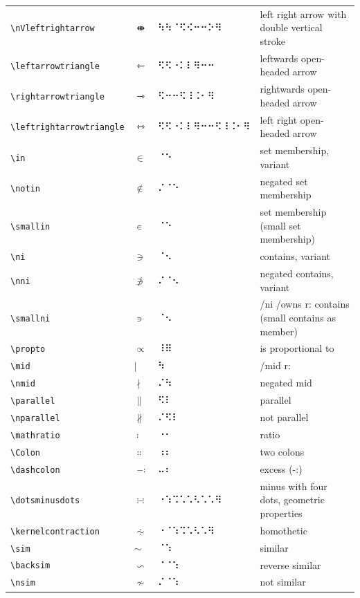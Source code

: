 \documentclass[oneside]{article}
\begin{document}
\begin{longtable}{llll}
\verb|\nVleftrightarrow| & $\nVleftrightarrow$ &   ⠳⠳⠈⠫⠪⠒⠒⠕⠻   & {left right arrow with double vertical stroke} \\[2ex]
\verb|\leftarrowtriangle| & $\leftarrowtriangle$ &   ⠫⠫⠐⠅⠇⠻⠒⠒   & {leftwards open-headed arrow} \\[2ex]
\verb|\rightarrowtriangle| & $\rightarrowtriangle$ &   ⠫⠒⠒⠫⠸⠨⠂⠻   & {rightwards open-headed arrow} \\[2ex]
\verb|\leftrightarrowtriangle| & $\leftrightarrowtriangle$ &   ⠫⠫⠐⠅⠇⠻⠒⠒⠫⠸⠨⠂⠻   & {left right open-headed arrow} \\[2ex]
\verb|\in| & $\in$ &   ⠈⠑   & {set membership, variant} \\[2ex]
\verb|\notin| & $\notin$ &   ⠌⠈⠑   & {negated set membership} \\[2ex]
\verb|\smallin| & $\smallin$ &   ⠈⠑   & {set membership (small set membership)} \\[2ex]
\verb|\ni| & $\ni$ &   ⠈⠢   & {contains, variant} \\[2ex]
\verb|\nni| & $\nni$ &   ⠌⠈⠢   & {negated contains, variant} \\[2ex]
\verb|\smallni| & $\smallni$ &   ⠈⠢   & {/ni /owns r: contains (small contains as member)} \\[2ex]
\verb|\propto| & $\propto$ &   ⠸⠿   & {is proportional to} \\[2ex]
\verb|\mid| & $\mid$ &   ⠳   & {/mid r:} \\[2ex]
\verb|\nmid| & $\nmid$ &   ⠌⠳   & {negated mid} \\[2ex]
\verb|\parallel| & $\parallel$ &   ⠫⠇   & {parallel} \\[2ex]
\verb|\nparallel| & $\nparallel$ &   ⠌⠫⠇   & {not parallel} \\[2ex]
\verb|\mathratio| & $\mathratio$ &   ⠐⠂   & {ratio} \\[2ex]
\verb|\Colon| & $\Colon$ &   ⠰⠆   & {two colons} \\[2ex]
\verb|\dashcolon| & $\dashcolon$ &   ⠤⠆   & {excess (-:)} \\[2ex]
\verb|\dotsminusdots| & $\dotsminusdots$ &   ⠐⠱⠩⠡⠡⠣⠡⠡⠻   & {minus with four dots, geometric properties} \\[2ex]
\verb|\kernelcontraction| & $\kernelcontraction$ &   ⠐⠈⠱⠩⠡⠣⠡⠻   & {homothetic} \\[2ex]
\verb|\sim| & $\sim$ &   ⠈⠱   & {similar} \\[2ex]
\verb|\backsim| & $\backsim$ &   ⠈⠈⠱   & {reverse similar} \\[2ex]
\verb|\nsim| & $\nsim$ &   ⠌⠈⠱   & {not similar} \\[2ex]

\end{longtable}
\end{document}
